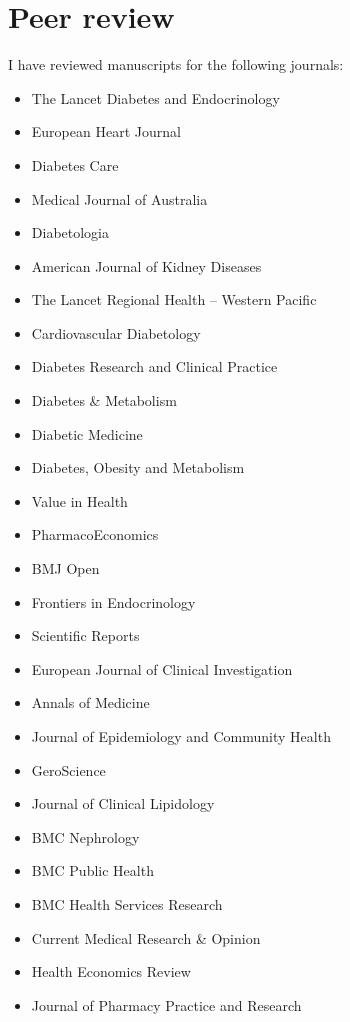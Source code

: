 \documentclass[11pt]{article}
\begin{document}
\section*{Peer review}
I have reviewed manuscripts for the following journals:
\begin{itemize}
\item The Lancet Diabetes and Endocrinology 
\item European Heart Journal 
\item Diabetes Care 
\item Medical Journal of Australia 
\item Diabetologia 
\item American Journal of Kidney Diseases 
\item The Lancet Regional Health – Western Pacific 
\item Cardiovascular Diabetology 
\item Diabetes Research and Clinical Practice 
\item Diabetes \& Metabolism 
\item Diabetic Medicine 
\item Diabetes, Obesity and Metabolism 
\item Value in Health 
\item PharmacoEconomics 
\item BMJ Open 
\item Frontiers in Endocrinology 
\item Scientific Reports 
\item European Journal of Clinical Investigation 
\item Annals of Medicine 
\item Journal of Epidemiology and Community Health 
\item GeroScience
\item Journal of Clinical Lipidology 
\item BMC Nephrology 
\item BMC Public Health 
\item BMC Health Services Research 
\item Current Medical Research  \& Opinion 
\item Health Economics Review 
\item Journal of Pharmacy Practice and Research 
\end{itemize}
\end{document}
